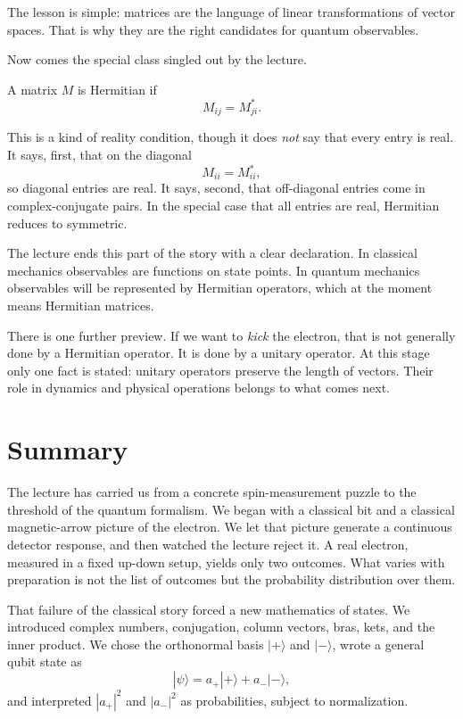 The lesson is simple: matrices are the language of linear transformations of vector spaces. That is why they are the right candidates for quantum observables.

Now comes the special class singled out by the lecture.

\begin{definition}
A matrix \(M\) is Hermitian if
\begin{equation}
M_{ij}=M_{ji}^*.
\end{equation}
\end{definition}

This is a kind of reality condition, though it does \emph{not} say that every entry is real. It says, first, that on the diagonal
\[
M_{ii}=M_{ii}^*,
\]
so diagonal entries are real. It says, second, that off-diagonal entries come in complex-conjugate pairs. In the special case that all entries are real, Hermitian reduces to symmetric.

The lecture ends this part of the story with a clear declaration. In classical mechanics observables are functions on state points. In quantum mechanics observables will be represented by Hermitian operators, which at the moment means Hermitian matrices.

There is one further preview. If we want to \emph{kick} the electron, that is not generally done by a Hermitian operator. It is done by a unitary operator. At this stage only one fact is stated: unitary operators preserve the length of vectors. Their role in dynamics and physical operations belongs to what comes next.

\section{Summary}

The lecture has carried us from a concrete spin-measurement puzzle to the threshold of the quantum formalism. We began with a classical bit and a classical magnetic-arrow picture of the electron. We let that picture generate a continuous detector response, and then watched the lecture reject it. A real electron, measured in a fixed up-down setup, yields only two outcomes. What varies with preparation is not the list of outcomes but the probability distribution over them.

That failure of the classical story forced a new mathematics of states. We introduced complex numbers, conjugation, column vectors, bras, kets, and the inner product. We chose the orthonormal basis \(|+\rangle\) and \(|-\rangle\), wrote a general qubit state as
\[
|\psi\rangle=a_+|+\rangle+a_-|-\rangle,
\]
and interpreted \(|a_+|^2\) and \(|a_-|^2\) as probabilities, subject to normalization.

